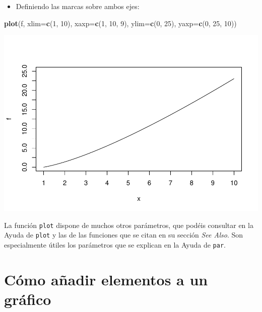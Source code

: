 \documentclass[
]{book}
\newenvironment{Shaded}{\begin{snugshade}}{\end{snugshade}}
\newcommand{\DataTypeTok}[1]{\textcolor[rgb]{0.13,0.29,0.53}{#1}}
\newcommand{\DecValTok}[1]{\textcolor[rgb]{0.00,0.00,0.81}{#1}}
\newcommand{\KeywordTok}[1]{\textcolor[rgb]{0.13,0.29,0.53}{\textbf{#1}}}
\newcommand{\NormalTok}[1]{#1}
\providecommand{\tightlist}{%
  \setlength{\itemsep}{0pt}\setlength{\parskip}{0pt}}
\theoremstyle{definition}
\theoremstyle{definition}
\theoremstyle{definition}
\theoremstyle{remark}
\begin{document}
\begin{itemize}
\tightlist
\item
  Definiendo las marcas sobre ambos ejes:
\end{itemize}

\begin{Shaded}
\begin{Highlighting}[]
\KeywordTok{plot}\NormalTok{(f, }\DataTypeTok{xlim=}\KeywordTok{c}\NormalTok{(}\DecValTok{1}\NormalTok{, }\DecValTok{10}\NormalTok{), }\DataTypeTok{xaxp=}\KeywordTok{c}\NormalTok{(}\DecValTok{1}\NormalTok{, }\DecValTok{10}\NormalTok{, }\DecValTok{9}\NormalTok{), }\DataTypeTok{ylim=}\KeywordTok{c}\NormalTok{(}\DecValTok{0}\NormalTok{, }\DecValTok{25}\NormalTok{), }\DataTypeTok{yaxp=}\KeywordTok{c}\NormalTok{(}\DecValTok{0}\NormalTok{, }\DecValTok{25}\NormalTok{, }\DecValTok{10}\NormalTok{))}
\end{Highlighting}
\end{Shaded}

\begin{center}\includegraphics[width=0.9\linewidth]{07chap06_Graficos_I_files/figure-latex/unnamed-chunk-19-1} \end{center}

La función \texttt{plot} dispone de muchos otros parámetros, que podéis consultar en la Ayuda de \texttt{plot} y las de las funciones que se citan en su sección \emph{See Also}. Son especialmente útiles los parámetros que se explican en la Ayuda de \texttt{par}.

\hypertarget{cuxf3mo-auxf1adir-elementos-a-un-gruxe1fico}{%
\section{Cómo añadir elementos a un gráfico}\label{cuxf3mo-auxf1adir-elementos-a-un-gruxe1fico}}
\end{document}
